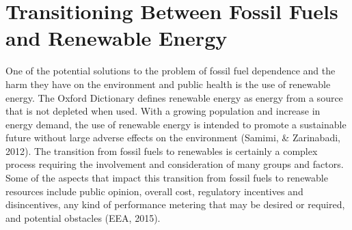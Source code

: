   \section{Transitioning Between Fossil Fuels and Renewable Energy}
  \par One of the potential solutions to the problem of fossil fuel dependence and the harm they have on the environment and public health is the use of renewable energy. The Oxford Dictionary defines renewable energy as energy from a source that is not depleted when used. With a growing population and increase in energy demand, the use of renewable energy is intended to promote a sustainable future without large adverse effects on the environment (Samimi, \& Zarinabadi, 2012). The transition from fossil fuels to renewables is certainly a complex process requiring the involvement and consideration of many groups and factors. Some of the aspects that impact this transition from fossil fuels to renewable resources include public opinion, overall cost, regulatory incentives and disincentives, any kind of performance metering that may be desired or required, and potential obstacles (EEA, 2015).

